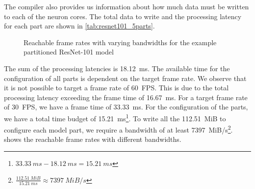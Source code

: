 The compiler also provides us information about how much data must be written to each of the neuron cores.
The total data to write and the processing latency for each part are shown in \cref{tab:resnet101_5parts}.

\begin{figure}[hbtp]
    \centering
    
    \caption{Reachable frame rates with varying bandwidths for the example partitioned ResNet-101 model}
    \label{fig:large_model_bandwidth_analysis_example_resnet101}
\end{figure}

The sum of the processing latencies is \SI{18.12}{ms}.
The available time for the configuration of all parts is dependent on the target frame rate.
We observe that it is not possible to target a frame rate of \SI{60}{FPS}.
This is due to the total processing latency exceeding the frame time of \SI{16.67}{ms}. 
For a target frame rate of \SI{30}{FPS}, we have a frame time of \SI{33.33}{ms}.
For the configuration of the parts, we have a total time budget of \SI{15.21}{ms}\footnote{$\SI{33.33}{ms} - \SI{18.12}{ms} = \SI{15.21}{ms}$}.
To write all the \SI{112.51}{MiB} to configure each model part, we require a bandwidth of at least \SI{7397}{MiB/s}\footnote{$\frac{\SI{112.51}{MiB}}{\SI{15.21}{ms}} \approx \SI{7397}{MiB/s}$}.
 shows the reachable frame rates with different bandwidths.
